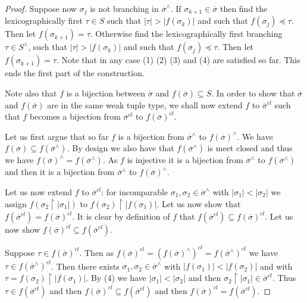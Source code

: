 \begin{proof}
Suppose now $\sigma_j$ is not branching in $\overline{\sigma}^{\wedge}$. If $\sigma_{k+1} \in \overline{\sigma}$ then find the lexicographically first $\tau \in S$ such that $|\tau| > |f(\sigma_k)|$ and such that $f(\sigma_j) \preceq \tau$. Then let $f(\sigma_{k+1}) = \tau$. Otherwise find the lexicographically first branching $\tau \in S^{\wedge}$, such that $|\tau| > |f(\sigma_k)|$ and such that $f(\sigma_j) \preceq \tau$. Then let $f(\sigma_{k+1}) = \tau$. Note that in any case (1) (2) (3) and (4) are satisfied so far. This ends the first part of the construction.

Note also that $f$ is a bijection between $\overline{\sigma}$ and $f(\overline{\sigma}) \subseteq S$. In order to show that $\overline{\sigma}$ and $f(\overline{\sigma})$ are in the same weak tuple type, we shall now extend $f$ to $\overline{\sigma}^{cl}$ such that $f$ becomes a bijection from $\overline{\sigma}^{cl}$ to $f(\overline{\sigma})^{cl}$.

Let us first argue that so far $f$ is a bijection from $\overline{\sigma}^{\wedge}$ to $f(\overline{\sigma})^{\wedge}$. We have $f(\overline{\sigma}) \subseteq f(\overline{\sigma}^{\wedge})$. By design we also have that $f(\overline{\sigma}^{\wedge})$ is meet closed and thus we have $f(\overline{\sigma})^{\wedge} = f(\overline{\sigma}^{\wedge})$. As $f$ is injective it is a bijection from $\overline{\sigma}^{\wedge}$ to $f(\overline{\sigma}^\wedge)$ and then it is a bijection from $\overline{\sigma}^{\wedge}$ to $f(\overline{\sigma})^\wedge$.

Let us now extend $f$ to $\overline{\sigma}^{cl}$: for incomparable $\sigma_1,\sigma_2 \in \overline{\sigma}^{\wedge}$ with $|\sigma_1| < |\sigma_2|$ we assign $f(\sigma_2 \upharpoonright {|\sigma_1|})$ to $f(\sigma_2)  \upharpoonright {|f(\sigma_1)|}$. Let us now show that $f(\overline{\sigma}^{cl}) = f(\overline{\sigma})^{cl}$. It is clear by definition of $f$ that $f(\overline{\sigma}^{cl}) \subseteq f(\overline{\sigma})^{cl}$. Let us now show $f(\overline{\sigma})^{cl} \subseteq f(\overline{\sigma}^{cl})$.

Suppose $\tau \in f(\overline{\sigma})^{cl}$. Then as $f(\overline{\sigma})^{cl} = (f(\overline{\sigma})^{\wedge})^{cl} = f(\overline{\sigma}^{\wedge})^{cl}$ we have $\tau \in f(\overline{\sigma}^{\wedge})^{cl}$. Then there exists $\sigma_1,\sigma_2 \in \overline{\sigma}^{\wedge}$ with $|f(\sigma_1)| < |f(\sigma_2)|$ and with $\tau = f(\sigma_2) \upharpoonright {|f(\sigma_1)|}$. By (4) we have $|\sigma_1| < |\sigma_2|$ and then $\sigma_2 \upharpoonright {|\sigma_1|} \in \overline{\sigma}^{cl}$. Thus $\tau \in f(\overline{\sigma}^{cl})$ and then $f(\overline{\sigma})^{cl} \subseteq f(\overline{\sigma}^{cl})$ and then $f(\overline{\sigma})^{cl} = f(\overline{\sigma}^{cl})$.


\end{proof}
